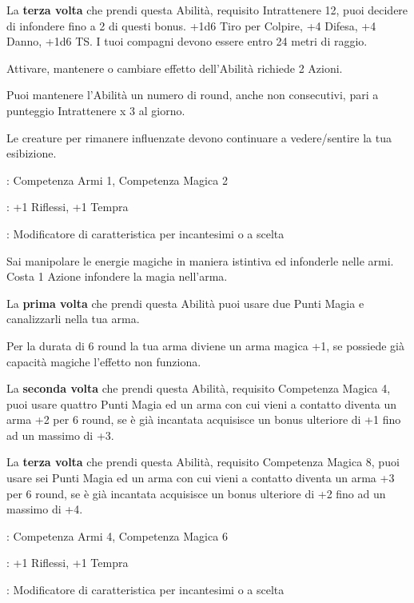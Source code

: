 \begin{multicols}{2}
La \textbf{terza volta} che prendi questa Abilità, requisito Intrattenere 12, puoi decidere di infondere fino a 2 di questi bonus. +1d6 Tiro per Colpire, +4 Difesa, +4 Danno, +1d6 TS. I tuoi compagni devono essere entro 24 metri di raggio.

Attivare, mantenere o cambiare effetto dell'Abilità richiede 2 Azioni.

Puoi mantenere l'Abilità un numero di round, anche non consecutivi, pari a punteggio Intrattenere x 3 al giorno.

Le creature per rimanere influenzate devono continuare a vedere/sentire la tua esibizione.

\begin{description}[noitemsep, topsep=0pt, parsep=0pt, partopsep=0pt, leftmargin=0cm, labelwidth=2.5cm]
    \item[\textbf{Requisito}]: Competenza Armi 1, Competenza Magica 2
    \item[\textbf{Tiri Salvezza}]: +1 Riflessi, +1 Tempra
    \item[\textbf{Caratteristica}]: Modificatore di caratteristica per incantesimi o a scelta
\end{description}

Sai manipolare le energie magiche in maniera istintiva ed infonderle nelle armi. Costa 1 Azione infondere la magia nell'arma.

La \textbf{prima volta} che prendi questa Abilità puoi usare due Punti Magia e canalizzarli nella tua arma.

Per la durata di 6 round la tua arma diviene un arma magica +1, se possiede già capacità magiche l'effetto non funziona.

La \textbf{seconda volta} che prendi questa Abilità, requisito Competenza Magica 4, puoi usare quattro Punti Magia ed un arma con cui vieni a contatto diventa un arma +2 per 6 round, se è già incantata acquisisce un bonus ulteriore di +1 fino ad un massimo di +3.

La \textbf{terza volta} che prendi questa Abilità, requisito Competenza Magica 8, puoi usare sei Punti Magia ed un arma con cui vieni a contatto diventa un arma +3 per 6 round, se è già incantata acquisisce un bonus ulteriore di +2 fino ad un massimo di +4.

\begin{description}[noitemsep, topsep=0pt, parsep=0pt, partopsep=0pt, leftmargin=0cm, labelwidth=2.5cm]
    \item[\textbf{Requisito}]: Competenza Armi 4, Competenza Magica 6
    \item[\textbf{Tiri Salvezza}]: +1 Riflessi, +1 Tempra
    \item[\textbf{Caratteristica}]: Modificatore di caratteristica per incantesimi o a scelta
\end{description}


\end{multicols}
